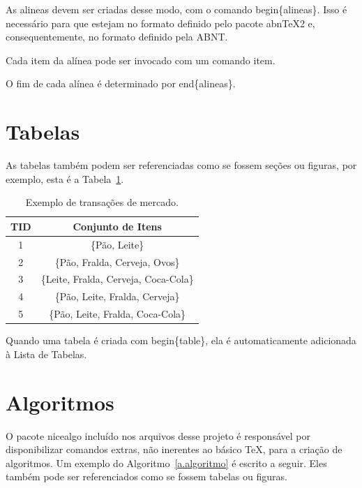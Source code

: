 \begin{alineas}
	
	\item As alineas devem ser criadas desse modo, com o comando begin\{alineas\}. Isso é necessário para que estejam no formato definido pelo pacote abnTeX2 e, consequentemente, no formato definido pela ABNT.
	
	\item Cada item da alínea pode ser invocado com um comando item.
	
	\item O fim de cada alínea é determinado por end\{alineas\}.
	
\end{alineas}

\section{Tabelas}
\label{s.tabelas}

As tabelas também podem ser referenciadas como se fossem seções ou figuras, por exemplo, esta é a Tabela~\ref{t.transacao_mercado}.

\begin{table}[h]
	\centering
	\begin{tabular}{c|c}
		\hline
		\textbf{\small TID} & \textbf{\small Conjunto de Itens}\\\hline \hline
		{\small 1} & {\small \{Pão, Leite\}}\\\hline
		{\small 2} & {\small \{Pão, Fralda, Cerveja, Ovos\}}\\\hline
		{\small 3} & {\small \{Leite, Fralda, Cerveja, Coca-Cola\}}\\\hline
		{\small 4} & {\small \{Pão, Leite, Fralda, Cerveja\}}\\\hline
		{\small 5} & {\small \{Pão, Leite, Fralda, Coca-Cola\}}\\\hline
	\end{tabular}
	\caption{Exemplo de transações de mercado.}
	\label{t.transacao_mercado}
\end{table}

Quando uma tabela é criada com begin\{table\}, ela é automaticamente adicionada à Lista de Tabelas.

\section{Algoritmos}
\label{s.algoritmos}

O pacote nicealgo incluído nos arquivos desse projeto é responsável por disponibilizar comandos extras, não inerentes ao básico TeX, para a criação de algoritmos. Um exemplo do Algoritmo~\ref{a.algoritmo} é escrito a seguir. Eles também pode ser referenciados como se fossem tabelas ou figuras.

